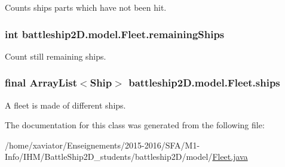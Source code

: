 Counts ships parts which have not been hit. 

\hypertarget{classbattleship2D_1_1model_1_1Fleet_a1e12ebdbc19e847806d5e41f69576cf7}{
\subsubsection[{remaining\-Ships}]{\setlength{\rightskip}{0pt plus 5cm}int battleship2\-D.\-model.\-Fleet.\-remaining\-Ships\hspace{0.3cm}{\ttfamily [private]}}}\label{classbattleship2D_1_1model_1_1Fleet_a1e12ebdbc19e847806d5e41f69576cf7}


Count still remaining ships. 

\hypertarget{classbattleship2D_1_1model_1_1Fleet_a969e704ee79c18874d9dddcf98401014}{
\subsubsection[{ships}]{\setlength{\rightskip}{0pt plus 5cm}final Array\-List$<${\bf Ship}$>$ battleship2\-D.\-model.\-Fleet.\-ships\hspace{0.3cm}{\ttfamily [private]}}}\label{classbattleship2D_1_1model_1_1Fleet_a969e704ee79c18874d9dddcf98401014}


A fleet is made of different ships. 



The documentation for this class was generated from the following file\-:\begin{DoxyCompactItemize}
\item 
/home/xaviator/\-Enseignements/2015-\/2016/\-S\-F\-A/\-M1-\/\-Info/\-I\-H\-M/\-Battle\-Ship2\-D\-\_\-students/battleship2\-D/model/\hyperlink{Fleet_8java}{Fleet.\-java}\end{DoxyCompactItemize}
